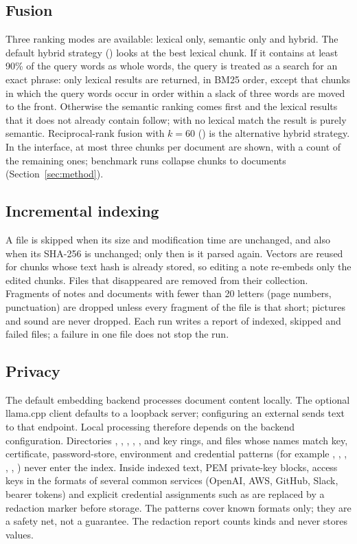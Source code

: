 \subsection{Fusion}
Three ranking modes are available: lexical only, semantic only and hybrid. The default hybrid strategy () looks at the best lexical chunk. If it contains at least 90\% of the query words as whole words, the query is treated as a search for an exact phrase: only lexical results are returned, in BM25 order, except that chunks in which the query words occur in order within a slack of three words are moved to the front. Otherwise the semantic ranking comes first and the lexical results that it does not already contain follow; with no lexical match the result is purely semantic. Reciprocal-rank fusion with $k=60$ () is the alternative hybrid strategy. In the interface, at most three chunks per document are shown, with a count of the remaining ones; benchmark runs collapse chunks to documents (Section~\ref{sec:method}).

\subsection{Incremental indexing}
A file is skipped when its size and modification time are unchanged, and also when its SHA-256 is unchanged; only then is it parsed again. Vectors are reused for chunks whose text hash is already stored, so editing a note re-embeds only the edited chunks. Files that disappeared are removed from their collection. Fragments of notes and documents with fewer than 20 letters (page numbers, punctuation) are dropped unless every fragment of the file is that short; pictures and sound are never dropped. Each run writes a report of indexed, skipped and failed files; a failure in one file does not stop the run.

\subsection{Privacy}
The default embedding backend processes document content locally. The optional llama.cpp client defaults to a loopback server; configuring an external  sends text to that endpoint. Local processing therefore depends on the backend configuration. Directories , , , , ,  and key rings, and files whose names match key, certificate, password-store, environment and credential patterns (for example , , , , , ) never enter the index. Inside indexed text, PEM private-key blocks, access keys in the formats of several common services (OpenAI, AWS, GitHub, Slack, bearer tokens) and explicit credential assignments such as  are replaced by a redaction marker before storage. The patterns cover known formats only; they are a safety net, not a guarantee. The redaction report counts kinds and never stores values.
